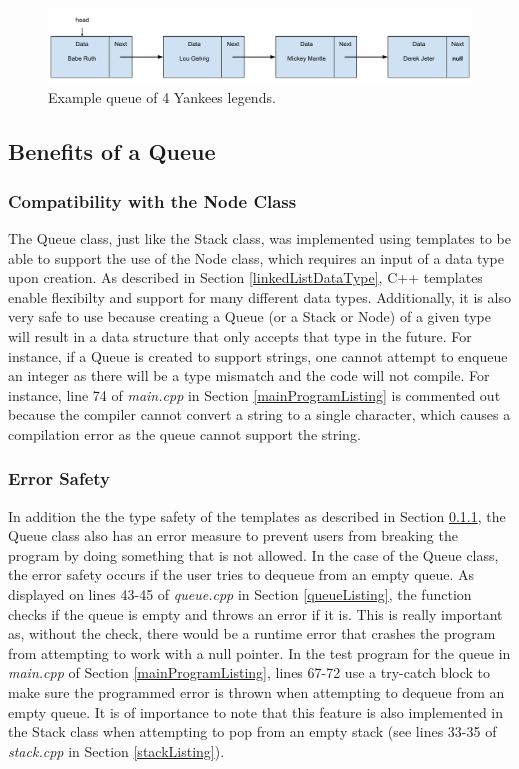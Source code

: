 \documentclass[letterpaper, 10pt,DIV=13]{scrartcl}
\numberwithin{equation}{section} %
\numberwithin{figure}{section} %
\numberwithin{table}{section} %
\begin{document}
\begin{figure}[ht] 
    \centering 
    \includegraphics[width=15cm]{queue}
    \caption{Example queue of 4 Yankees legends.}
    \label{figure:queue}
 \end{figure}

\subsection{Benefits of a Queue}
\subsubsection{Compatibility with the Node Class}\label{queueNodes}
The Queue class, just like the Stack class, was implemented using templates to be able to support the use of the Node class, which requires an input of a data type upon
creation. As described in Section \ref{linkedListDataType}, C++ templates enable flexibilty and support for many different data types. Additionally, it is also very
safe to use because creating a Queue (or a Stack or Node) of a given type will result in a data structure that only accepts that type in the future. For instance, if a Queue is created
to support strings, one cannot attempt to enqueue an integer as there will be a type mismatch and the code will not compile. For instance, line 74 of \textit{main.cpp}
in Section \ref{mainProgramListing} is commented out because the compiler cannot convert a string to a single character, which causes a compilation error as the queue
cannot support the string.

\subsubsection{Error Safety}
In addition the the type safety of the templates as described in Section \ref{queueNodes}, the Queue class also has an error measure to prevent users from breaking
the program by doing something that is not allowed. In the case of the Queue class, the error safety occurs if the user tries to dequeue from an empty queue. As displayed on
lines 43-45 of \textit{queue.cpp} in Section \ref{queueListing}, the function checks if the queue is empty and throws an error if it is. This is really important
as, without the check, there would be a runtime error that crashes the program from attempting to work with a null pointer. In the test program for the queue in \textit{main.cpp} of
Section \ref{mainProgramListing}, lines 67-72 use a try-catch block to make sure the programmed error is thrown when attempting to dequeue from an
empty queue. It is of importance to note that this feature is also implemented in the Stack class when attempting to pop from an empty stack (see lines 
33-35 of \textit{stack.cpp} in Section \ref{stackListing}).
\end{document}
